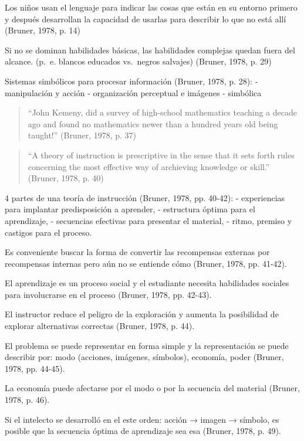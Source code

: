 \documentclass[
  12,
]{scrartcl}
\begin{document}
Los niños usan el lenguaje para indicar las cosas que están en su
entorno primero y después desarrollan la capacidad de usarlas para
describir lo que no está allí (Bruner, 1978, p. 14)

Si no se dominan habilidades básicas, las habilidades complejas quedan
fuera del alcance. (p.~e. blancos educados vs.~negros salvajes) (Bruner,
1978, p. 29)

Sistemas simbólicos para procesar información (Bruner, 1978, p. 28): -
manipulación y acción - organización perceptual e imágenes - simbólica

\begin{quote}
``John Kemeny, did a survey of high-school mathematics teaching a decade
ago and found no mathematics newer than a hundred years old being
taught!'' (Bruner, 1978, p. 37)
\end{quote}

\begin{quote}
``A theory of instruction is prescriptive in the sense that it sets
forth rules concerning the most effective way of archieving knowledge or
skill.'' (Bruner, 1978, p. 40)
\end{quote}

4 partes de una teoría de instrucción (Bruner, 1978, pp. 40-42): -
experiencias para implantar predisposición a aprender, - estructura
óptima para el aprendizaje, - secuencias efectivas para presentar el
material, - ritmo, premiso y castigos para el proceso.

Es conveniente buscar la forma de convertir las recompensas externas por
recompensas internas pero aún no se entiende cómo (Bruner, 1978, pp.
41-42).

El aprendizaje es un proceso social y el estudiante necesita habilidades
sociales para involucrarse en el proceso (Bruner, 1978, pp. 42-43).

El instructor reduce el peligro de la exploración y aumenta la
posibilidad de explorar alternativas correctas (Bruner, 1978, p. 44).

El problema se puede representar en forma simple y la representación se
puede describir por: modo (acciones, imágenes, símbolos), economía,
poder (Bruner, 1978, pp. 44-45).

La economía puede afectarse por el modo o por la secuencia del material
(Bruner, 1978, p. 46).

Si el intelecto se desarrolló en el este orden: acción → imagen →
símbolo, es posible que la secuencia óptima de aprendizaje sea esa
(Bruner, 1978, p. 49).
\end{document}
